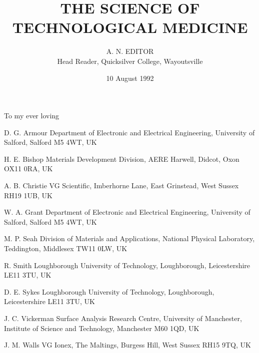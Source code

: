


%
\title{THE SCIENCE OF \\TECHNOLOGICAL MEDICINE}
\author{A. N. EDITOR\\
        Head Reader, Quicksilver College, Wayoutsville}
\date{10 August 1992}

\newtheorem{theorem}{Theorem}[chapter]
\newcommand{\blackboard}{\bf }


\maketitle %

\chapter*{}
\thispagestyle{empty}
\begin{center}
  To my ever loving
\end{center}

\cleardoublepage
\tableofcontents
\cleardoublepage

\begin{listofcontributors}
  \item [D. G. Armour]  Department of Electronic and Electrical
Engineering, University of Salford, Salford M5 4WT, UK
  \item [H. E. Bishop]  Materials Development Division, AERE Harwell,
Didcot, Oxon OX11 0RA, UK
  \item [A. B. Christie]  VG Scientific, Imberhorne Lane, East
Grinstead, West Sussex RH19 1UB, UK
  \item [W. A. Grant]  Department of Electronic and Electrical
Engineering, University of Salford, Salford M5 4WT, UK
  \item [M. P. Seah]  Division of Materials and Applications, National
Physical Laboratory, Teddington, Middlesex TW11 0LW, UK
  \item [R. Smith]  Loughborough University of Technology, Loughborough,
Leicestershire LE11 3TU, UK
  \item [D. E. Sykes]  Loughborough University of Technology,
Loughborough, Leicestershire LE11 3TU, UK
  \item [J. C. Vickerman]  Surface Analysis Research Centre, University
of Manchester, Institute of Science and Technology, Manchester M60 1QD, UK
  \item [J. M. Walls]  VG Ionex, The Maltings, Burgess Hill, West
Sussex RH15 9TQ, UK
 \end{listofcontributors}

